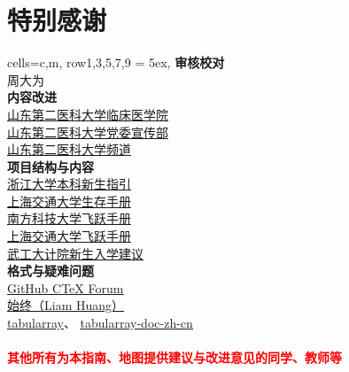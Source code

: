 \chapter*{特别感谢}
\begin{tblr}[
        long,
        theme=no-caption
    ]{
        cells={c,m},
        row{1,3,5,7,9} = {5ex},
    }
    {\large\textbf{审核校对}}                                                             \\
    {周大为}                                                                              \\
    {\large\textbf{内容改进}}                                                             \\
    {
    \uline{\href{https://xchb.sdsmu.edu.cn/}{山东第二医科大学临床医学院}}                 \\
    \uline{\href{https://xchb.sdsmu.edu.cn/}{山东第二医科大学党委宣传部}}                 \\
    \uline{\href{https://pd.qq.com/s/7mekdr5ve}{山东第二医科大学频道}}
    }                                                                                     \\
    {\large\textbf{项目结构与内容}}                                                       \\
    {
    \uline{\href{https://zjuers.com/welcome/}{浙江大学本科新生指引}}                      \\
    \uline{\href{https://survivesjtu.gitbook.io/survivesjtumanual}{上海交通大学生存手册}} \\
    \uline{\href{https://sustech-application.com/}{南方科技大学飞跃手册}}                 \\
    \uline{\href{https://survivesjtu.github.io/SJTU-Application/}{上海交通大学飞跃手册}}  \\
    \uline{\href{https://gitee.com/hanyaner/witjij}{武工大计院新生入学建议}}
    }                                                                                     \\
    {\large\textbf{格式与疑难问题}}                                                       \\
    {
    \uline{\href{https://github.com/CTeX-org/forum/issues}{GitHub CTeX Forum}}            \\
    \uline{\href{https://liam.page}{始终（Liam Huang）}}                                  \\
    \uline{\href{https://github.com/lvjr/tabularray}{tabularray}}、%
    \uline{\href{https://gitee.com/nwafu_nan/tabularray-doc-zh-cn}{tabularray-doc-zh-cn}}
    }                                                                                     \\
    \\
    {\large\textbf{\textcolor{red}{其他所有为本指南、地图提供建议与改进意见的同学、教师等}}}
\end{tblr}

